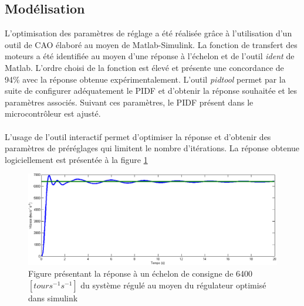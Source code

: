 \subsection{Modélisation}
L'optimisation des paramètres de réglage a été réalisée grâce à l'utilisation d'un outil de CAO élaboré au moyen de Matlab-Simulink. La fonction de transfert des moteurs a été identifiée au moyen d'une réponse à l'échelon et de l'outil \textit{ident} de Matlab. L'ordre choisi de la fonction est élevé et présente une concordance de 94\% avec la réponse obtenue expérimentalement. L'outil \textit{pidtool} permet par la suite de configurer adéquatement le PIDF et d'obtenir la réponse souhaitée et les paramètres associés. Suivant ces paramètres, le PIDF présent dans le microcontrôleur est ajusté.
\paragraph{}L'usage de l'outil interactif permet d'optimiser la réponse et d'obtenir des paramètres de préréglages qui limitent le nombre d'itérations. La réponse obtenue logiciellement est présentée à la figure \ref{fig:as_1}
\begin{figure}[htbp]
\centering
\includegraphics[scale=0.6]{fig/asservissement_1.png}
\caption{Figure présentant la réponse à un échelon de consigne de 6400$\left[tours^{-1}s^{-1}\right]$ du système régulé au moyen du régulateur optimisé dans simulink}
\label{fig:as_1}
\end{figure}

